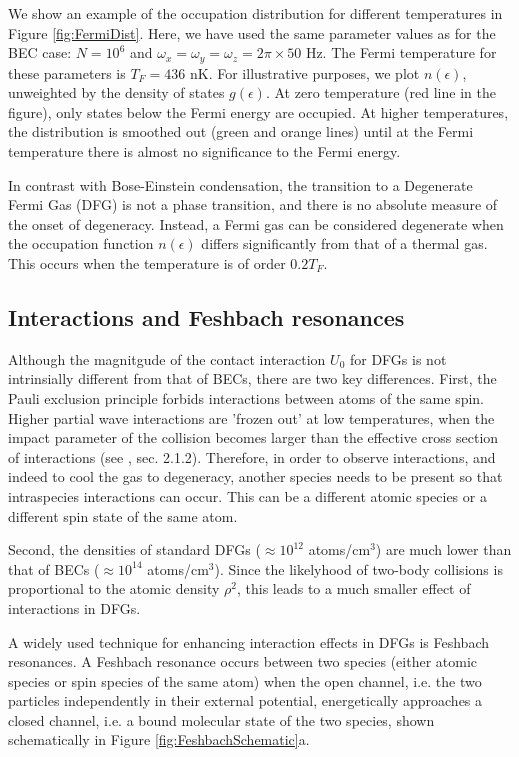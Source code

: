 We show an example of the occupation distribution for different temperatures in Figure \ref{fig:FermiDist}. Here, we have used the same parameter values as for the BEC case: $N=10^6$ and $\omega_x=\omega_y=\omega_z=2\pi\times 50$ Hz. The Fermi temperature for these parameters is $T_F=436$ nK.  For illustrative purposes, we plot $n(\epsilon)$, unweighted by the density of states $g(\epsilon)$. At zero temperature (red line in the figure), only states below the Fermi energy are occupied. At higher temperatures, the distribution is smoothed out (green and orange lines) until at the Fermi temperature there is almost no significance to the Fermi energy.

In contrast with Bose-Einstein condensation, the transition to a Degenerate Fermi Gas (DFG) is not a phase transition, and there is no absolute measure of the onset of degeneracy. Instead, a Fermi gas can be considered degenerate when the occupation function $n(\epsilon)$ differs significantly from that of a thermal gas. This occurs when the temperature is of order $0.2 T_F$. 

\subsection{Interactions and Feshbach resonances}\label{sec:Feshbach}
Although the magnitgude of the contact interaction $U_0$ for DFGs is not intrinsially different from that of BECs, there are two key differences. First, the Pauli exclusion principle forbids \swave{} interactions between atoms of the same spin. Higher partial wave interactions are 'frozen out' at low temperatures, when the impact parameter of the collision becomes larger than the effective cross section of interactions (see \cite{KetterleDFG}, sec. 2.1.2). Therefore, in order to observe interactions, and indeed to cool the gas to degeneracy, another species needs to be present so that intraspecies \swave{} interactions can occur. This can be a different atomic species or a different spin state of the same atom. 

Second, the densities of standard DFGs ($\approx 10^{12}$ atoms/cm$^3$) are much lower than that of BECs ($\approx 10^{14}$ atoms/cm$^3$). Since the likelyhood of two-body collisions is proportional to the atomic density $\rho^2$, this leads to a much smaller effect of interactions in DFGs.

A widely used technique for enhancing interaction effects in DFGs is Feshbach resonances. A Feshbach resonance occurs between two species (either atomic species or spin species of the same atom) when the open channel, i.e. the two particles independently in their external potential, energetically approaches a closed channel, i.e. a bound molecular state of the two species, shown schematically in Figure \ref{fig:FeshbachSchematic}a. 

